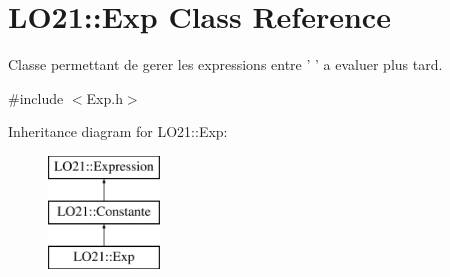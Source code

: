 \hypertarget{class_l_o21_1_1_exp}{\section{\-L\-O21\-:\-:\-Exp \-Class \-Reference}
\label{class_l_o21_1_1_exp}
}


\-Classe permettant de gerer les expressions entre ' ' a evaluer plus tard.  




{\ttfamily \#include $<$\-Exp.\-h$>$}

\-Inheritance diagram for \-L\-O21\-:\-:\-Exp\-:\begin{figure}[H]
\begin{center}
\leavevmode
\includegraphics[height=3.000000cm]{class_l_o21_1_1_exp}
\end{center}
\end{figure}
